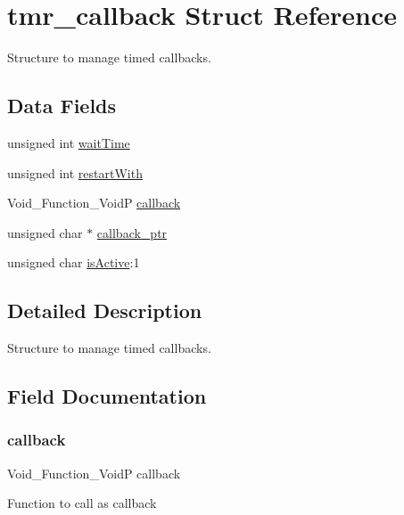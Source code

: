 \hypertarget{structtmr__callback}{}\section{tmr\+\_\+callback Struct Reference}
\label{structtmr__callback}


Structure to manage timed callbacks.  


\subsection*{Data Fields}
\begin{DoxyCompactItemize}
\item 
unsigned int \hyperlink{structtmr__callback_a3dd2bf8b269e3fa033cdf888d425c0a1}{wait\+Time}
\item 
unsigned int \hyperlink{structtmr__callback_ab5e3bcb44e429e65c5e0a9eacd064049}{restart\+With}
\item 
Void\+\_\+\+Function\+\_\+\+VoidP \hyperlink{structtmr__callback_ae3b4038c83a340e7843217ac6dda627d}{callback}
\item 
unsigned char $\ast$ \hyperlink{structtmr__callback_a142fadbc946a29365d91cb1ca55f1d26}{callback\+\_\+ptr}
\item 
unsigned char \hyperlink{structtmr__callback_a45a2bb46f70a64688f7c9ada4b28a0cb}{is\+Active}\+:1
\end{DoxyCompactItemize}


\subsection{Detailed Description}
Structure to manage timed callbacks. 

\subsection{Field Documentation}
\mbox{\label{structtmr__callback_ae3b4038c83a340e7843217ac6dda627d}} 
\subsubsection{\texorpdfstring{callback}{callback}}
{\footnotesize\ttfamily Void\+\_\+\+Function\+\_\+\+VoidP callback}

Function to call as callback \mbox{\label{structtmr__callback_a142fadbc946a29365d91cb1ca55f1d26}} 
